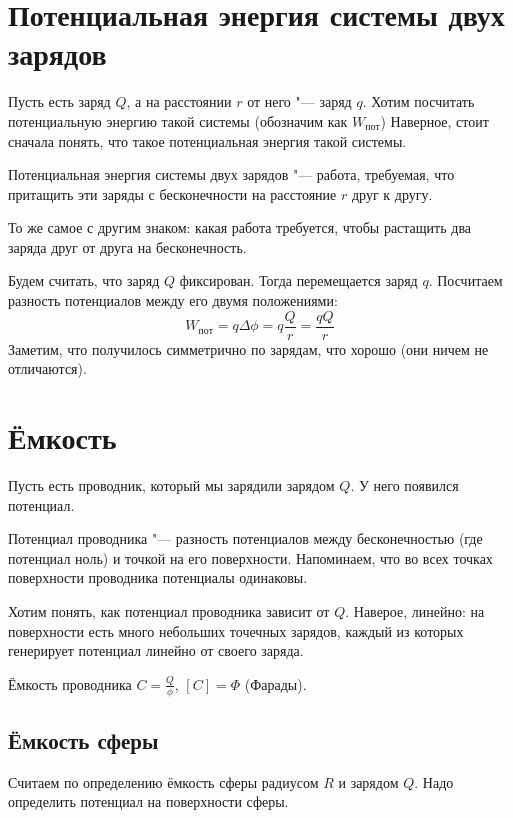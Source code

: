 \section{Потенциальная энергия системы двух зарядов}
  Пусть есть заряд $Q$, а на расстоянии $r$ от него "--- заряд $q$.
  Хотим посчитать потенциальную энергию такой системы (обозначим как $W_{пот}$)
  Наверное, стоит сначала понять, что такое потенциальная энергия такой системы.
  \begin{Def}
    Потенциальная энергия системы двух зарядов "--- работа, требуемая, что притащить
    эти заряды с бесконечности на расстояние $r$ друг к другу.
  \end{Def}
  \begin{Rem}
    То же самое с другим знаком: какая работа требуется, чтобы растащить два заряда друг от друга на бесконечность.
  \end{Rem}
  Будем считать, что заряд $Q$ фиксирован.
  Тогда перемещается заряд $q$.
  Посчитаем разность потенциалов между его двумя положениями:
  \[W_{пот} = q \Delta \phi = q \frac{Q} r = \frac{qQ}{r}\]
  Заметим, что получилось симметрично по зарядам, что хорошо (они ничем не отличаются).

\section{Ёмкость}
  Пусть есть проводник, который мы зарядили зарядом $Q$.
  У него появился потенциал.
  \begin{Def}
    Потенциал проводника "--- разность потенциалов между бесконечностью (где потенциал ноль) и точкой на его поверхности.
    Напоминаем, что во всех точках поверхности проводника потенциалы одинаковы.
  \end{Def}
  Хотим понять, как потенциал проводника зависит от $Q$.
  Наверое, линейно: на поверхности есть много небольших точечных зарядов, каждый из которых генерирует потенциал линейно от своего заряда.
  \begin{Def}
    Ёмкость проводника $C=\frac{Q}{\phi}$, $[C]=\Phi$ (Фарады).
  \end{Def}

  \subsection{Ёмкость сферы}
    Считаем по определению ёмкость сферы радиусом $R$ и зарядом $Q$.
    Надо определить потенциал на поверхности сферы.
